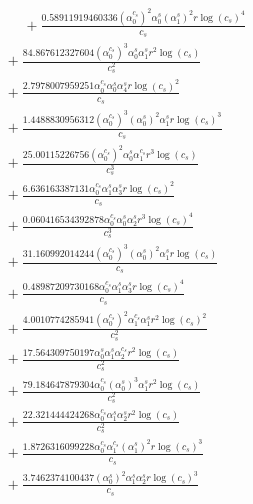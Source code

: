 \documentclass[10pt]{article}
\begin{document}
\begin{align*}
\phantom{R_{2,8}} &\phantom{={}}{}  + \frac{0.58911919460336 \left(\alpha_{0}^{c_s}\right)^{2} \alpha_{0}^s \left(\alpha_{1}^s\right)^{2} r \log{\left(c_{s} \right)}^{4}}{c_{s}} \\
&{}  + \frac{84.867612327604 \left(\alpha_{0}^{c_s}\right)^{3} \alpha_{0}^s \alpha_{1}^s r^{2} \log{\left(c_{s} \right)}}{c_{s}^{2}} \\
&{}  + \frac{2.7978007959251 \alpha_{0}^{c_s} \alpha_{0}^s \alpha_{4}^s r \log{\left(c_{s} \right)}^{2}}{c_{s}} \\
&{}  + \frac{1.4488830956312 \left(\alpha_{0}^{c_s}\right)^{3} \left(\alpha_{0}^s\right)^{2} \alpha_{1}^s r \log{\left(c_{s} \right)}^{3}}{c_{s}} \\
&{}  + \frac{25.00115226756 \left(\alpha_{0}^{c_s}\right)^{2} \alpha_{0}^s \alpha_{1}^{c_s} r^{3} \log{\left(c_{s} \right)}}{c_{s}^{3}} \\
&{}  + \frac{6.636163387131 \alpha_{0}^{c_s} \alpha_{1}^s \alpha_{3}^s r \log{\left(c_{s} \right)}^{2}}{c_{s}} \\
&{}  + \frac{0.060416534392878 \alpha_{0}^{c_s} \alpha_{0}^s \alpha_{2}^s r^{3} \log{\left(c_{s} \right)}^{4}}{c_{s}^{3}} \\
&{}  + \frac{31.160992014244 \left(\alpha_{0}^{c_s}\right)^{3} \left(\alpha_{0}^s\right)^{2} \alpha_{1}^s r \log{\left(c_{s} \right)}}{c_{s}} \\
&{}  + \frac{0.48987209730168 \alpha_{0}^{c_s} \alpha_{1}^s \alpha_{3}^s r \log{\left(c_{s} \right)}^{4}}{c_{s}} \\
&{}  + \frac{4.0010774285941 \left(\alpha_{0}^{c_s}\right)^{2} \alpha_{1}^{c_s} \alpha_{1}^s r^{2} \log{\left(c_{s} \right)}^{2}}{c_{s}^{2}} \\
&{}  + \frac{17.564309750197 \alpha_{0}^s \alpha_{1}^s \alpha_{2}^{c_s} r^{2} \log{\left(c_{s} \right)}}{c_{s}^{2}} \\
&{}  + \frac{79.184647879304 \alpha_{0}^{c_s} \left(\alpha_{0}^s\right)^{3} \alpha_{1}^s r^{2} \log{\left(c_{s} \right)}}{c_{s}^{2}} \\
&{}  + \frac{22.321444424268 \alpha_{0}^{c_s} \alpha_{1}^s \alpha_{2}^s r^{2} \log{\left(c_{s} \right)}}{c_{s}^{2}} \\
&{}  + \frac{1.8726316099228 \alpha_{0}^{c_s} \alpha_{1}^{c_s} \left(\alpha_{1}^s\right)^{2} r \log{\left(c_{s} \right)}^{3}}{c_{s}} \\
&{}  + \frac{3.7462374100437 \left(\alpha_{0}^s\right)^{2} \alpha_{1}^s \alpha_{2}^s r \log{\left(c_{s} \right)}^{3}}{c_{s}} \\

\end{align*}
\end{document}
